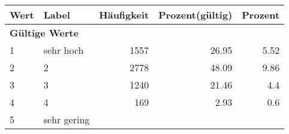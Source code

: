      \begin{longtable}{lXrrr}
     \toprule
     \textbf{Wert} & \textbf{Label} & \textbf{Häufigkeit} & \textbf{Prozent(gültig)} & \textbf{Prozent} \\
     \endhead
     \midrule
     \multicolumn{5}{l}{\textbf{Gültige Werte}}\\

     1 &
     \multicolumn{1}{X}{ sehr hoch   } &


       \num{1557} &
       \num[round-mode=places,round-precision=2]{26.95} &
         \num[round-mode=places,round-precision=2]{5.52} \\

     2 &
     \multicolumn{1}{X}{ 2   } &


       \num{2778} &
       \num[round-mode=places,round-precision=2]{48.09} &
         \num[round-mode=places,round-precision=2]{9.86} \\

     3 &
     \multicolumn{1}{X}{ 3   } &


       \num{1240} &
       \num[round-mode=places,round-precision=2]{21.46} &
         \num[round-mode=places,round-precision=2]{4.4} \\

     4 &
     \multicolumn{1}{X}{ 4   } &


       \num{169} &
       \num[round-mode=places,round-precision=2]{2.93} &
         \num[round-mode=places,round-precision=2]{0.6} \\

     5 &
     \multicolumn{1}{X}{ sehr gering   } &



\end{longtable}

